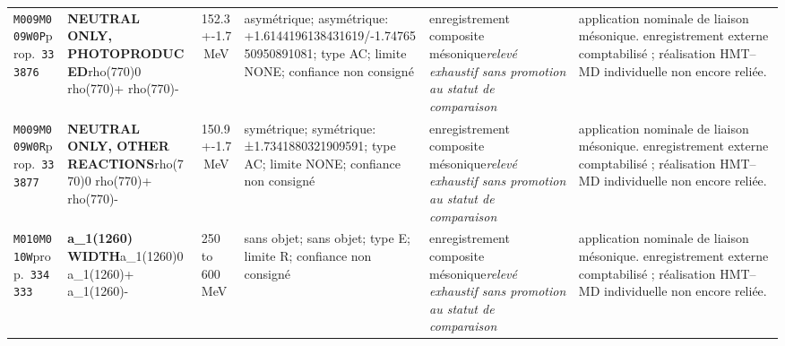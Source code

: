 \begin{landscape}
\begin{longtable}{L{1.85cm}L{4.45cm}L{2.35cm}L{4.05cm}L{3.35cm}L{7.15cm}}
\texttt{M009}\newline \texttt{M009W0P}\newline prop.\ \texttt{333876} & \textbf{NEUTRAL ONLY, PHOTOPRODUCED}\newline rho(770)0 \textbar{}\allowbreak{} rho(770)+ \textbar{}\allowbreak{} rho(770)- & 152.3+-1.7\,MeV & asymétrique; asymétrique: +1.6144196138431619/-1.7476550950891081; type AC; limite NONE; confiance non consigné & enregistrement composite mésonique\newline \emph{relevé exhaustif sans promotion au statut de comparaison} & application nominale de liaison mésonique. enregistrement externe comptabilisé ; réalisation HMT--MD individuelle non encore reliée. \\
\texttt{M009}\newline \texttt{M009W0R}\newline prop.\ \texttt{333877} & \textbf{NEUTRAL ONLY, OTHER REACTIONS}\newline rho(770)0 \textbar{}\allowbreak{} rho(770)+ \textbar{}\allowbreak{} rho(770)- & 150.9+-1.7\,MeV & symétrique; symétrique: ±1.7341880321909591; type AC; limite NONE; confiance non consigné & enregistrement composite mésonique\newline \emph{relevé exhaustif sans promotion au statut de comparaison} & application nominale de liaison mésonique. enregistrement externe comptabilisé ; réalisation HMT--MD individuelle non encore reliée. \\
\texttt{M010}\newline \texttt{M010W}\newline prop.\ \texttt{334333} & \textbf{a\_\allowbreak{}1(1260) WIDTH}\newline a\_\allowbreak{}1(1260)0 \textbar{}\allowbreak{} a\_\allowbreak{}1(1260)+ \textbar{}\allowbreak{} a\_\allowbreak{}1(1260)- & 250 to 600\,MeV & sans objet; sans objet; type E; limite R; confiance non consigné & enregistrement composite mésonique\newline \emph{relevé exhaustif sans promotion au statut de comparaison} & application nominale de liaison mésonique. enregistrement externe comptabilisé ; réalisation HMT--MD individuelle non encore reliée. \\

\end{longtable}
\end{landscape}
